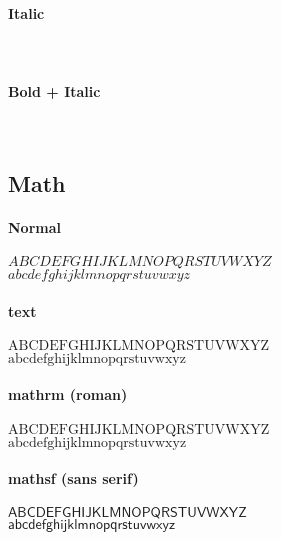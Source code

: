 \documentclass[class=scrartcl,crop=false]{standalone}
\begin{document}
\\

\paragraph{Italic}

\\

\paragraph{Bold + Italic}

\\

\newpage

\subsection{Math}

\paragraph{Normal}

$ABCDEFGHIJKLMNOPQRSTUVWXYZ$\\
$abcdefghijklmnopqrstuvwxyz$

\paragraph{text}

$\text{ABCDEFGHIJKLMNOPQRSTUVWXYZ}$\\
$\text{abcdefghijklmnopqrstuvwxyz}$

\paragraph{mathrm (roman)}

$\mathrm{ABCDEFGHIJKLMNOPQRSTUVWXYZ}$\\
$\mathrm{abcdefghijklmnopqrstuvwxyz}$

\paragraph{mathsf (sans serif)}

$\mathsf{ABCDEFGHIJKLMNOPQRSTUVWXYZ}$\\
$\mathsf{abcdefghijklmnopqrstuvwxyz}$
\end{document}
